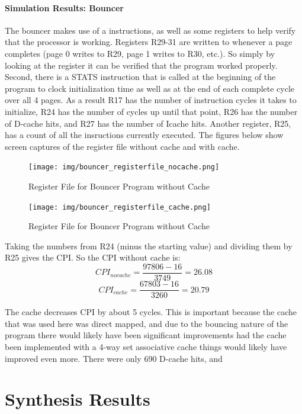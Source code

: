 \documentclass[11pt,letterpaper,]{article}
\begin{document}
\paragraph{ Simulation Results: Bouncer }
The bouncer makes use of a instructions, as well as some registers to help verify that the processor is working.  Registers R29-31 are written to whenever a page completes (page 0 writes to R29, page 1 writes to R30, etc.).  So simply by looking at the register it can be verified that the program worked properly.  Second, there is a 
STATS instruction that is called at the beginning of the program to clock initialization time as well as at the end of each complete cycle over all 4 pages.  As a result R17 has the number of instruction cycles it takes to initialize, R24 has the number of cycles up until that point, R26 has the number of D-cache hits, and R27 has the number of Icache hits.  Another register, R25, has a count of all the insructions currently executed. The figures below show screen captures of the register file without cache and with cache.
\begin{figure}[ht]
  \centering
  \texttt{[image: img/bouncer\_registerfile\_nocache.png]}
  \caption{Register File for Bouncer Program without Cache}
  \label{fig:datapath}
\end{figure}
  
\begin{figure}[ht]
  \centering
  \texttt{[image: img/bouncer\_registerfile\_cache.png]}
  \caption{Register File for Bouncer Program without Cache}
  \label{fig:datapath}
\end{figure}
  
Taking the numbers from R24 (minus the starting value) and dividing them by R25 gives the CPI.  So the CPI without cache is: 
$$CPI_{nocache} = \frac{97806 - 16}{3749} = 26.08$$
$$CPI_{cache} = \frac{67803 - 16}{3260} = 20.79$$

The cache decreases CPI by about 5 cycles.  This is important because the cache that was used here was direct mapped, and due to the bouncing nature of the program there would likely have been significant improvements had the cache been implemented with a 4-way set associative cache things would likely have improved even more. There were only 690 D-cache hits, and 



\section{ Synthesis Results }
\label{Results:Synthesis}
\end{document}
